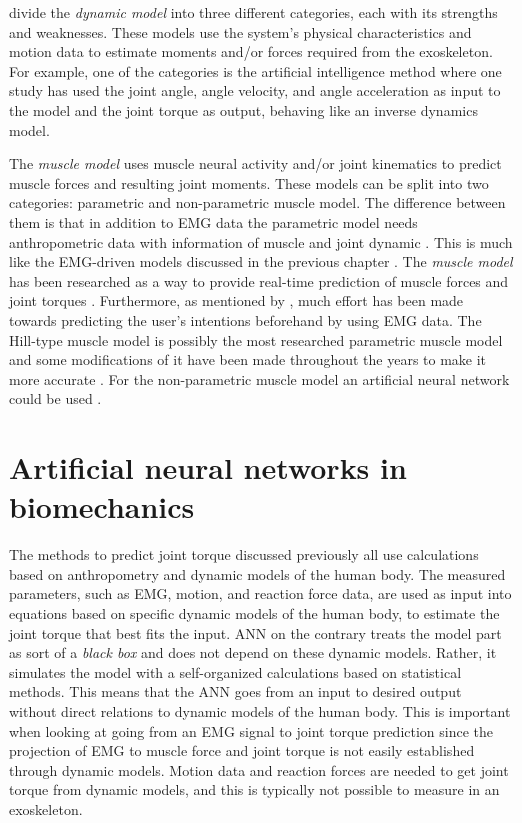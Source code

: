 \documentclass[../main.tex]{subfiles}
\begin{document}
\textcite{Anam2012} divide the \textit{dynamic model} into three different categories, each with its strengths and weaknesses.
These models use the system's physical characteristics and motion data to estimate moments and/or forces required from the exoskeleton. 
For example, one of the categories is the artificial intelligence method where one study has used the joint angle, angle velocity, and angle acceleration as input to the model and the joint torque as output, behaving like an inverse dynamics model.

The \textit{muscle model} uses muscle neural activity and/or joint kinematics to predict muscle forces and resulting joint moments. 
These models can be split into two categories: parametric and non-parametric muscle model. 
The difference between them is that in addition to \ac{EMG} data the parametric model needs anthropometric data with information of muscle and joint dynamic \cite{Anam2012}.
This is much like the \ac{EMG}-driven models discussed in the previous chapter \cite{Pizzolato2015}.
The \textit{muscle model} has been researched as a way to provide real-time prediction of muscle forces and joint torques \cite{Pizzolato2015, Anam2012, durandau}. 
Furthermore, as mentioned by \textcite{Anam2012}, much effort has been made towards predicting the user's intentions beforehand by using \ac{EMG} data.
The Hill-type muscle model is possibly the most researched parametric muscle model and some modifications of it have been made throughout the years to make it more accurate \cite{Pizzolato2015, Lloyd2003, Anam2012, Lee14-1}.
For the non-parametric muscle model an artificial neural network could be used \cite{Lee14-1, Kiguchi2012}.  

\section{Artificial neural networks in biomechanics}
The methods to predict joint torque discussed previously all use calculations based on anthropometry and dynamic models of the human body. 
The measured parameters, such as \ac{EMG}, motion, and reaction force data, are used as input into equations based on specific dynamic models of the human body, to estimate the joint torque that best fits the input.
\Ac{ANN} on the contrary treats the model part as sort of a \textit{black box} and does not depend on these dynamic models. 
Rather, it simulates the model with a self-organized calculations based on statistical methods.
This means that the \ac{ANN} goes from an input to desired output without direct relations to dynamic models of the human body.
This is important when looking at going from an \ac{EMG} signal to joint torque prediction since the projection of \ac{EMG} to muscle force and joint torque is not easily established through dynamic models.
Motion data and reaction forces are needed to get joint torque from dynamic models, and this is typically not possible to measure in an exoskeleton.
\end{document}
